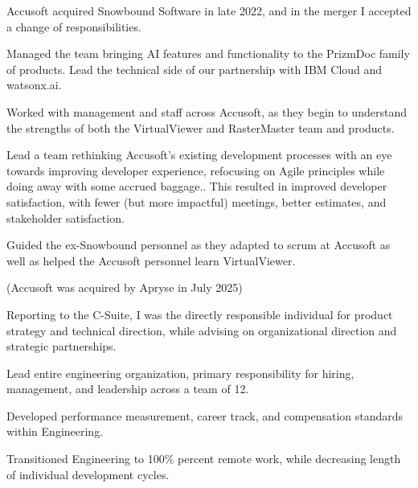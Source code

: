 \documentclass[letterpaper,10pt]{article}
\begin{document}
  \begin{resume_list}
    \item Accusoft acquired Snowbound Software in late 2022, and in the
        merger I accepted a change of responsibilities.
    \item Managed the team bringing AI features and functionality to the
        PrizmDoc family of products. Lead the technical side of our
        partnership with IBM Cloud and watsonx.ai.
    \item Worked with management and staff across Accusoft, as they begin to
        understand the strengths of both the VirtualViewer and RasterMaster
        team and products.
    \item Lead a team rethinking Accusoft's existing development processes
        with an eye towards improving developer experience, refocusing on
        Agile principles while doing away with some accrued baggage.. This
        resulted in improved developer satisfaction, with fewer (but more
        impactful) meetings, better estimates, and stakeholder satisfaction.
    \item Guided the ex-Snowbound personnel as they adapted to scrum at
        Accusoft as well as helped the Accusoft personnel learn
        VirtualViewer.
    \item (Accusoft was acquired by Apryse in July 2025)
  \end{resume_list}

  \begin{resume_list}
    \item Reporting to the C-Suite, I was the directly responsible individual for product strategy and technical direction, while advising on organizational direction and strategic partnerships.
    \item Lead entire engineering organization, primary responsibility for hiring, management, and leadership across a team of 12.
    \item Developed performance measurement, career track, and compensation standards within Engineering.
    \item Transitioned Engineering to 100\% percent remote work, while decreasing length of individual development cycles.
  \end{resume_list}
     
\end{document}
